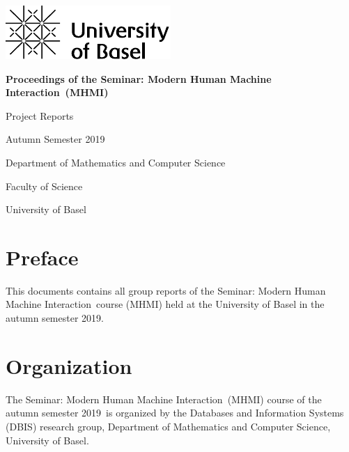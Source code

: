 \documentclass[runningheads,a4paper]{llncs}
\newenvironment{produceProceedings}{}{}
\newcommand{\coursename}{Seminar: Modern Human Machine Interaction}
\newcommand{\courseacronym}{MHMI}
\newcommand{\semester}{autumn semester 2019}
\newcommand{\Semester}{Autumn Semester 2019}
\newcommand{\proceedingsSubtitle}{Project Reports}
\begin{document}
	
\begin{produceProceedings}
	
	\begin{titlepage}
		\includegraphics{UniBas_Logo_EN_Schwarz_RGB_65}
		
		\vspace{80pt}
		
		\centering
		
		\begin{spacing}{2.8}
		{\Huge {} \bfseries Proceedings of the \coursename\ (\courseacronym)}
		\end{spacing}
		
		\vspace{25pt}
		
		{\large \proceedingsSubtitle}
		
		\vspace{50pt}
		
		{\large \Semester}
		
		\vspace{50pt}
		
		{\large	Department of Mathematics and Computer Science}
		
		\vspace{5pt}
		
		{\large Faculty of Science}
		
		\vspace{25pt}
		
		{\large	University of Basel}
	\end{titlepage}
	
	
	\pagestyle{headings}
	\chapter*{Preface}
	This documents contains all group reports of the \coursename\ course (\courseacronym) held at the University of Basel in the \semester.
	\chapter*{Organization}
	The \coursename\ (\courseacronym) course of the \semester\ is organized by the Databases and Information Systems (DBIS) research group, Department of Mathematics and Computer Science, University of Basel.

\end{produceProceedings}
\end{document}
